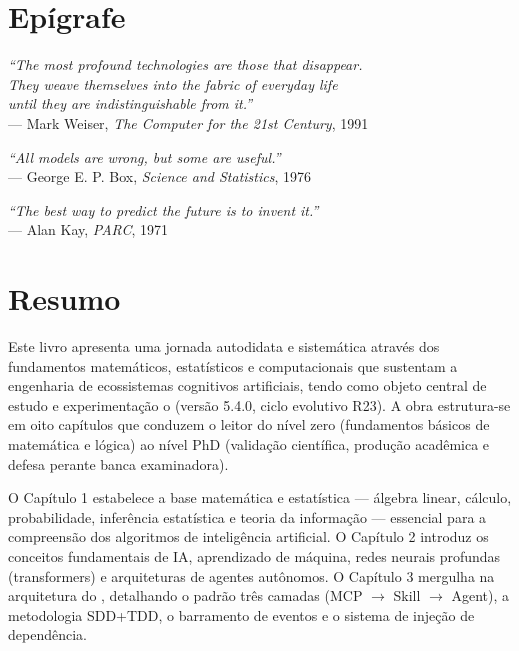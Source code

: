 \chapter*{Epígrafe}
\label{ch:epigrafe}

\vspace*{\fill}
\begin{flushright}
\textit{``The most profound technologies are those that disappear.}\\
\textit{They weave themselves into the fabric of everyday life}\\
\textit{until they are indistinguishable from it.''}\\[0.3cm]
--- Mark Weiser, \textit{The Computer for the 21st Century}, 1991\par
\vspace{1cm}
\textit{``All models are wrong, but some are useful.''}\\[0.3cm]
--- George E. P. Box, \textit{Science and Statistics}, 1976\par
\vspace{1cm}
\textit{``The best way to predict the future is to invent it.''}\\[0.3cm]
--- Alan Kay, \textit{PARC}, 1971\par
\end{flushright}
\vspace*{\fill}

\chapter*{Resumo}
\label{ch:resumo}

Este livro apresenta uma jornada autodidata e sistemática através dos fundamentos 
matemáticos, estatísticos e computacionais que sustentam a engenharia de 
ecossistemas cognitivos artificiais, tendo como objeto central de estudo e 
experimentação o \opencodeeco{} (versão 5.4.0, ciclo evolutivo R23). 
A obra estrutura-se em oito capítulos que conduzem o leitor do nível zero 
(fundamentos básicos de matemática e lógica) ao nível PhD (validação 
científica, produção acadêmica \qualisA{} e defesa perante banca examinadora).

O Capítulo 1 estabelece a base matemática e estatística --- álgebra linear, 
cálculo, probabilidade, inferência estatística e teoria da informação --- 
essencial para a compreensão dos algoritmos de inteligência artificial. 
O Capítulo 2 introduz os conceitos fundamentais de IA, aprendizado de máquina, 
redes neurais profundas (transformers) e arquiteturas de agentes autônomos. 
O Capítulo 3 mergulha na arquitetura do \opencodeeco, detalhando o padrão 
três camadas (MCP $\rightarrow$ Skill $\rightarrow$ Agent), a metodologia 
SDD+TDD, o barramento de eventos e o sistema de injeção de dependência.

